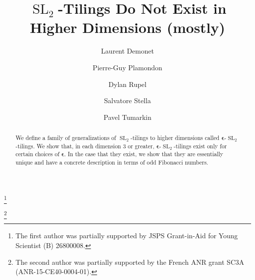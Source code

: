 \documentclass[12pt]{amsart}
\newcommand{\bepsilon}{\boldsymbol{\epsilon}}
\newcommand{\SL}{\operatorname{SL}}
\begin{document}
\title{$\SL_2$-Tilings Do Not Exist in Higher Dimensions (mostly)}

\author[Demonet]{Laurent Demonet}
\address[Laurent Demonet]{Graduate School of Mathematics, Nagoya University, Furocho, Chikusaku, 464-8602 Nagoya, Japan}
\thanks{The first author was partially supported by JSPS Grant-in-Aid for Young Scientist (B) 26800008.}

\author[Plamondon]{Pierre-Guy Plamondon}
\address[Pierre-Guy Plamondon]{Laboratoire de Math\'ematiques d'Orsay, Univ. Paris-Sud, CNRS, Univ.
Paris-Saclay, 91405 Orsay, France.}
\thanks{The second author was partially supported by the French ANR grant SC3A (ANR-15-CE40-0004-01).}

\author[Rupel]{Dylan Rupel}
\address[Dylan Rupel]{Department of Mathematics, University of Notre Dame, Notre Dame, Indiana 46556, USA.}

\author[Stella]{Salvatore Stella}
\address[Salvatore Stella]{IN$d$AM - Marie Curie Actions fellow, Universit\`a ``La Sapienza'', Roma, Italy.}

\author[Tumarkin]{Pavel Tumarkin}
\address[Pavel Tumarkin]{Department of Mathematical Sciences, Durham University, South Road, Durham, DH1 3LE, UK.}

\begin{abstract}
  We define a family of generalizations of $\SL_2$-tilings to higher dimensions called $\bepsilon$-$\SL_2$-tilings.  
  We show that, in each dimension 3 or greater, $\bepsilon$-$\SL_2$-tilings exist only for certain choices of $\bepsilon$.  
  In the case that they exist, we show that they are essentially unique and have a concrete description in terms of odd Fibonacci numbers.
\end{abstract}

\maketitle
\end{document}
